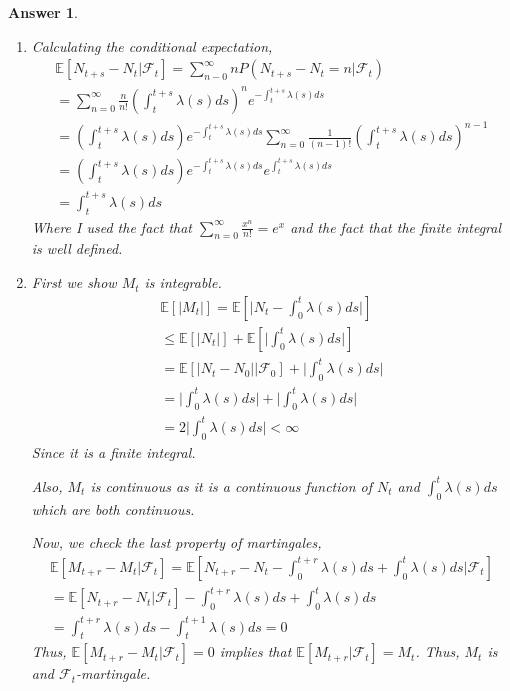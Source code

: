 \documentclass[12pt]{article}
\theoremstyle{colon}
\newtheorem*{answer}{Answer}
\begin{document}
\begin{answer}
  \leavevmode
  \begin{enumerate}[label=\alph*)]
    \item Calculating the conditional expectation,
      \begin{gather*}
        \mathbb{E}[N_{t+s} - N_t | \mathcal{F}_t] = \sum_{n-0}^\infty n P(N_{t+s} - N_t = n | \mathcal{F}_t) \\
        = \sum_{n=0}^\infty \frac{n}{n!} \left( \int_t^{t+s} \lambda(s)ds \right)^n e^{-\int_t^{t+s} \lambda(s)ds} \\
        = \left( \int_t^{t+s} \lambda(s)ds \right)e^{-\int_t^{t+s} \lambda(s)ds} \sum_{n=0}^\infty \frac{1}{(n-1)!} \left( \int_t^{t+s} \lambda(s)ds \right)^{n-1} \\
        = \left( \int_t^{t+s} \lambda(s)ds \right)e^{-\int_t^{t+s} \lambda(s)ds}e^{\int_t^{t+s} \lambda(s)ds} \\
        = \int_t^{t+s} \lambda(s)ds
      \end{gather*}
      Where I used the fact that $\sum_{n = 0}^\infty \frac{x^n}{n!} = e^x$ and the fact that the finite integral is well defined.
    \item First we show $M_t$ is integrable.
      \begin{gather*}
        \mathbb{E}[ \lvert M_t \rvert ] = \mathbb{E}[ \lvert N_t - \int_0^t \lambda(s) ds \rvert ] \\
        \leq \mathbb{E}[ \lvert N_t \rvert ] + \mathbb{E}[ \lvert \int_0^t \lambda(s) ds \rvert ] \\
        = \mathbb{E}[ \lvert N_t - N_0 \rvert | \mathcal{F}_0] + \lvert \int_0^t \lambda(s) ds \rvert \\
        = \lvert \int_0^{t} \lambda(s)ds \rvert + \lvert \int_0^t \lambda(s) ds \rvert \\
        = 2 \lvert \int_0^t \lambda(s) ds \rvert < \infty
      \end{gather*}
      Since it is a finite integral.

      Also, $M_t$ is continuous as it is a continuous function of $N_t$ and $\int_0^t \lambda(s) ds$ which are both continuous.

      Now, we check the last property of martingales,
      \begin{gather*}
        \mathbb{E}[ M_{t+r} - M_t | \mathcal{F}_t ] = \mathbb{E}[ N_{t+r} - N_t - \int_0^{t+r} \lambda(s) ds + \int_0^{t} \lambda(s)ds | \mathcal{F}_t ] \\
        = \mathbb{E}[ N_{t+r} - N_t | \mathcal{F}_t ] - \int_0^{t+r} \lambda(s) ds + \int_0^{t} \lambda(s)ds \\
        = \int_t^{t+r} \lambda(s)ds - \int_t^{t+1} \lambda(s) ds = 0
      \end{gather*}
      Thus, $\mathbb{E}[ M_{t+r} - M_t | \mathcal{F}_t ] = 0$ implies that $\mathbb{E}[ M_{t+r} | \mathcal{F}_t ] = M_t$. Thus, $M_t$ is and $\mathcal{F}_t$-martingale.
  \end{enumerate}
\end{answer}
\end{document}
